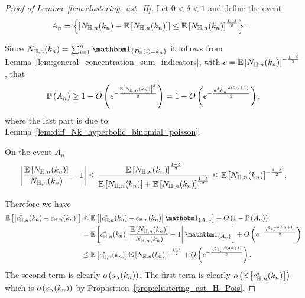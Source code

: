 \begin{proof}[Proof of Lemma~\ref{lem:clustering_ast_H}]
Let $0 < \delta < 1$ and define the event
\begin{align*}
	A_n &= \left\{\left|N_{\mathbb{H},n}(k_n) - \mathbb{E}\left[N_{\mathbb{H},n}(k_n)\right]\right| \le \mathbb{E}\left[N_{\mathbb{H},n}(k_n)\right]^{\frac{1 + \delta}{2}}\right\}.
\end{align*}

Since $N_{\H,n}(k_n) = \sum_{i = 1}^n \ind{D_\H(i) = k_n}$ it follows from Lemma~\ref{lem:general_concentration_sum_indicators}, with $c = \mathbb{E}\left[N_{\mathbb{H},n}(k_n)\right]^{-\frac{1-\delta}{2}}$, that
\begin{equation}\label{eq:clustering_ast_H_prob_A}
	\mathbb{P}\left(A_n\right) \ge 1 - O\left(e^{-\frac{\mathbb{E}\left[N_{\mathbb{H},n}(k_n)\right]^\delta}{2}}\right) = 1 - O\left(e^{-\frac{n^\delta k_n^{-\delta(2\alpha + 1)}}{2}}\right),
\end{equation}
where the last part is due to Lemma~\ref{lem:diff_Nk_hyperbolic_binomial_poisson}. 

On the event $A_n$
\[
	\left|\frac{\mathbb{E}\left[N_{\mathbb{H},n}(k_n)\right]}{N_{\mathbb{H},n}(k_n)} - 1\right| 
	\le \frac{\mathbb{E}\left[N_{\mathbb{H},n}(k_n)\right]^{\frac{1 + \delta}{2}}}{\mathbb{E}\left[N_{\mathbb{H},n}(k_n)\right]+\mathbb{E}\left[N_{\mathbb{H},n}(k_n)\right]^{\frac{1 + \delta}{2}}}
	\le \mathbb{E}\left[N_{\mathbb{H},n}(k_n)\right]^{-\frac{1 - \delta}{2}}.
\]

Therefore we have
\begin{align*}
	\Exp{\left|c_{\H, n}^\ast(k_n) - c_{\H, n}(k_n)\right|}
	&\le \Exp{\left|c_{\H, n}^\ast(k_n) - c_{\H, n}(k_n)\right|\ind{A_n}} + \bigO{1 - \Prob{A_n}}\\
	&= \Exp{c_{\H, n}^\ast(k_n)\left|\frac{\Exp{N_{\H,n}(k_n)}}{N_{\H,n}(k_n)} - 1\right|\ind{A_n}}
		+ \bigO{e^{-\frac{n^\delta k_n^{-\delta(2\alpha + 1)}}{2}}}\\
	&\le \Exp{c_{\H, n}^\ast(k_n)}\Exp{N_{\H,n}(k_n)}^{-\frac{1 - \delta}{2}} 
		+ \bigO{e^{-\frac{n^\delta k_n^{-\delta(2\alpha + 1)}}{2}}}.
\end{align*}
The second term is clearly $o\left(s_\alpha(k_n)\right)$. The first term is clearly $o\left(\mathbb{E}\left[c_{\mathbb{H}, n}^\ast(k_n)\right]\right)$ which is $o\left(s_\alpha(k_n)\right)$ by Proposition~\ref{prop:clustering_ast_H_Pois}. 
\end{proof}









